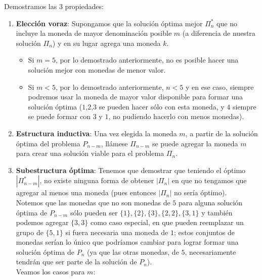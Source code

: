 \documentclass[spanish, fleqn]{article}
\DeclarePairedDelimiter{\ceil}{\lceil}{\rceil}
\begin{document}
\begin{enumerate}
Demostramos las 3 propiedades:
\begin{enumerate}
\item \textbf{Elección voraz}: Supongamos que la solución óptima mejor $\Pi_n^*$ que no incluye la moneda de mayor denominación posible $m$ (a diferencia de nuestra solución $\Pi_n$) y en su lugar agrega una moneda $k$.
\begin{itemize}
\item Si $m=5$, por lo demostrado anteriormente, no es posible hacer una solución mejor con monedas de menor valor.
\item Si $m<5$, por lo demostrado anteriormente, $n<5$ y en ese caso, siempre podremos usar la moneda de mayor valor disponible para formar una solución óptima ($1$,$2$,$3$ se pueden hacer sólo con esta moneda, y $4$ siempre se puede formar con $3$ y $1$, no pudiendo hacerlo con menos monedas).
\end{itemize}
\item \textbf{Estructura inductiva}: Una vez elegida la moneda $m$, a partir de la solución óptima del problema $P_{n-m}$, llámese $\Pi_{n-m}$ se puede agregar la moneda $m$ para crear una solución viable para el problema $\Pi_{n}$.
\item \textbf{Subestructura óptima}: Tenemos que demostrar que teniendo el óptimo $|\Pi_{n-m}^*|$, no existe ninguna forma de obtener $|\Pi_n|$ en que no tengamos que agregar al menos una moneda (pues entonces $|\Pi_n|$ no sería óptimo).
\\ Notemos que las monedas que no son monedas de $5$ para alguna solución óptima de $P_{n-m}$ sólo pueden ser $\{1\},\{2\},\{3\},\{2,2\},\{3,1\}$ y también podemos agregar $\{3,3\}$ como caso especial, en que pueden reemplazar un grupo de $\{5,1\}$ si fuera necesaria una moneda de $1$; estos conjuntos de monedas serían lo único que podríamos cambiar para lograr formar una solución óptima de $P_{n}$ (ya que las otras monedas, de $5$, necesariamente tendrán que ser parte de la solución de $P_{n}$).
\\Veamos los casos para $m$:

\end{enumerate}
\end{enumerate}
\end{document}
